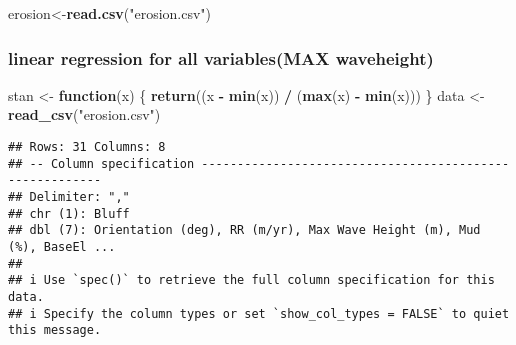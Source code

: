 \documentclass[
]{article}
\newenvironment{Shaded}{\begin{snugshade}}{\end{snugshade}}
\newcommand{\ControlFlowTok}[1]{\textcolor[rgb]{0.13,0.29,0.53}{\textbf{#1}}}
\newcommand{\FunctionTok}[1]{\textcolor[rgb]{0.13,0.29,0.53}{\textbf{#1}}}
\newcommand{\NormalTok}[1]{#1}
\newcommand{\OtherTok}[1]{\textcolor[rgb]{0.56,0.35,0.01}{#1}}
\newcommand{\SpecialCharTok}[1]{\textcolor[rgb]{0.81,0.36,0.00}{\textbf{#1}}}
\newcommand{\StringTok}[1]{\textcolor[rgb]{0.31,0.60,0.02}{#1}}
\begin{document}
\begin{Shaded}
\begin{Highlighting}[]
\NormalTok{erosion}\OtherTok{\textless{}{-}}\FunctionTok{read.csv}\NormalTok{(}\StringTok{"erosion.csv"}\NormalTok{)}
\end{Highlighting}
\end{Shaded}

\hypertarget{linear-regression-for-all-variablesmax-waveheight}{%
\subsubsection{linear regression for all variables(MAX
waveheight)}\label{linear-regression-for-all-variablesmax-waveheight}}

\begin{Shaded}
\begin{Highlighting}[]
\NormalTok{stan }\OtherTok{\textless{}{-}} \ControlFlowTok{function}\NormalTok{(x) \{}
  \FunctionTok{return}\NormalTok{((x }\SpecialCharTok{{-}} \FunctionTok{min}\NormalTok{(x)) }\SpecialCharTok{/}\NormalTok{ (}\FunctionTok{max}\NormalTok{(x) }\SpecialCharTok{{-}} \FunctionTok{min}\NormalTok{(x)))}
\NormalTok{\}}
\NormalTok{data }\OtherTok{\textless{}{-}} \FunctionTok{read\_csv}\NormalTok{(}\StringTok{"erosion.csv"}\NormalTok{)}
\end{Highlighting}
\end{Shaded}

\begin{verbatim}
## Rows: 31 Columns: 8
## -- Column specification --------------------------------------------------------
## Delimiter: ","
## chr (1): Bluff
## dbl (7): Orientation (deg), RR (m/yr), Max Wave Height (m), Mud (%), BaseEl ...
## 
## i Use `spec()` to retrieve the full column specification for this data.
## i Specify the column types or set `show_col_types = FALSE` to quiet this message.
\end{verbatim}
\end{document}
